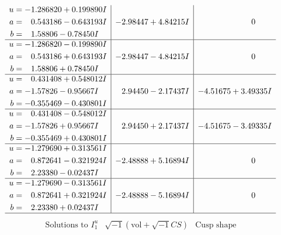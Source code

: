 \documentclass[1p]{elsarticle_modified}
\theoremstyle{definition}
\newcommand{\I}{\sqrt{-1}}
\begin{document}
$$\begin{array}{c|c|c}
\begin{aligned}
u &= -1.286820 + 0.199890 I \\
a &= \phantom{-}0.543186 - 0.643193 I \\
b &= \phantom{-}1.58806 - 0.78450 I\end{aligned}
 & -2.98447 + 4.84215 I & \phantom{-0.000000 } 0 \\ \hline\begin{aligned}
u &= -1.286820 - 0.199890 I \\
a &= \phantom{-}0.543186 + 0.643193 I \\
b &= \phantom{-}1.58806 + 0.78450 I\end{aligned}
 & -2.98447 - 4.84215 I & \phantom{-0.000000 } 0 \\ \hline\begin{aligned}
u &= \phantom{-}0.431408 + 0.548012 I \\
a &= -1.57826 - 0.95667 I \\
b &= -0.355469 - 0.430801 I\end{aligned}
 & \phantom{-}2.94450 - 2.17437 I & -4.51675 + 3.49335 I \\ \hline\begin{aligned}
u &= \phantom{-}0.431408 - 0.548012 I \\
a &= -1.57826 + 0.95667 I \\
b &= -0.355469 + 0.430801 I\end{aligned}
 & \phantom{-}2.94450 + 2.17437 I & -4.51675 - 3.49335 I \\ \hline\begin{aligned}
u &= -1.279690 + 0.313561 I \\
a &= \phantom{-}0.872641 - 0.321924 I \\
b &= \phantom{-}2.23380 - 0.02437 I\end{aligned}
 & -2.48888 + 5.16894 I & \phantom{-0.000000 } 0 \\ \hline\begin{aligned}
u &= -1.279690 - 0.313561 I \\
a &= \phantom{-}0.872641 + 0.321924 I \\
b &= \phantom{-}2.23380 + 0.02437 I\end{aligned}
 & -2.48888 - 5.16894 I & \phantom{-0.000000 } 0\\
 \hline 
 \end{array}$$\newpage$$\begin{array}{c|c|c}  
\text{Solutions to }I^u_{1}& \I (\text{vol} + \sqrt{-1}CS) & \text{Cusp shape}\\
 \hline 
\begin{aligned}

\end{aligned}
\end{array}$$
\end{document}
